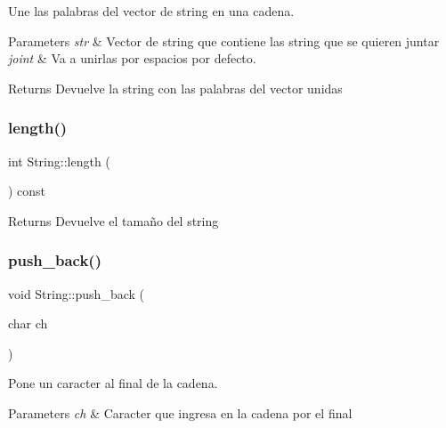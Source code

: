 Une las palabras del vector de string en una cadena. 


\begin{DoxyParams}{Parameters}
{\em str} & Vector de string que contiene las string que se quieren juntar \\
\hline
{\em joint} & Va a unirlas por espacios por defecto. \\
\hline
\end{DoxyParams}
\begin{DoxyReturn}{Returns}
Devuelve la string con las palabras del vector unidas 
\end{DoxyReturn}
\mbox{\label{class_string_a79366b9ecdbde9701a9acfe0009a5ded}} 
\subsubsection{\texorpdfstring{length()}{length()}}
{\footnotesize\ttfamily int String\+::length (\begin{DoxyParamCaption}{ }\end{DoxyParamCaption}) const}

\begin{DoxyReturn}{Returns}
Devuelve el tamaño del string 
\end{DoxyReturn}
\mbox{\label{class_string_a9f2d7c4ca8aa53bd86532461d700e572}} 
\subsubsection{\texorpdfstring{push\+\_\+back()}{push\_back()}}
{\footnotesize\ttfamily void String\+::push\+\_\+back (\begin{DoxyParamCaption}\item[{char}]{ch }\end{DoxyParamCaption})}



Pone un caracter al final de la cadena. 


\begin{DoxyParams}{Parameters}
{\em ch} & Caracter que ingresa en la cadena por el final \\
\hline
\end{DoxyParams}
\mbox{\label{class_string_a767d727438ffc76ba42a89498adca4d0}} 
